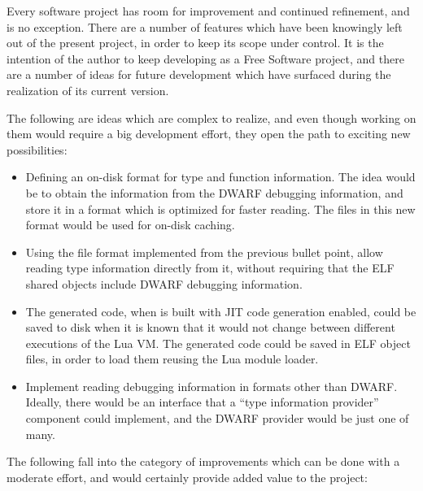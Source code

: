 Every software project has room for improvement and continued refinement, and
\Eol* is no exception. There are a number of features which have been
knowingly left out of the present project, in order to keep its scope under
control. It is the intention of the author to keep developing \Eol* as a Free
Software project, and there are a number of ideas for future development which
have surfaced during the realization of its current version.

The following are ideas which are complex to realize, and even though working
on them would require a big development effort, they open the path to exciting
new possibilities:

\begin{itemize}

	\item Defining an on-disk format for type and function information. The
	idea would be to obtain the information from the DWARF debugging
	information, and store it in a format which is optimized for faster
	reading. The files in this new format would be used for on-disk caching.

	\item Using the file format implemented from the previous bullet point,
	allow reading type information directly from it, without requiring that
	the ELF shared objects include DWARF debugging information.

	\item The generated code, when \Eol* is built with JIT code generation
	enabled, could be saved to disk when it is known that it would not change
	between different executions of the Lua VM. The generated code could be
	saved in ELF object files, in order to load them reusing the Lua module
	loader.

	\item Implement reading debugging information in formats other than DWARF.
	Ideally, there would be an interface that a “type information provider”
	component could implement, and the DWARF provider would be just one of
	many.

\end{itemize}

The following fall into the category of improvements which can be done with
a moderate effort, and would certainly provide added value to the project:

